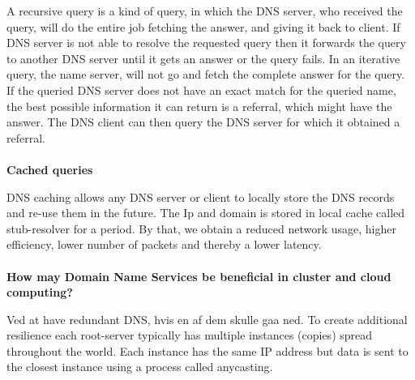 A recursive query is a kind of query, in which the DNS server, who received the query, will do the entire job fetching the answer, and giving it back to client. If DNS server is not able to resolve the requested query then it forwards the query to another DNS server until it gets an answer or the query fails.
In an iterative query, the name server, will not go and fetch the complete answer for the query. If the queried DNS server does not have an exact match for the queried name, the best possible information it can return is a referral, which might have the answer. The DNS client can then query the DNS server for which it obtained a referral.
\\\\
\textbf{Cached queries}

DNS caching allows any DNS server or client to locally store the DNS records and re-use them in the future. The Ip and domain is stored in local cache called stub-resolver for a period. By that, we obtain a reduced network usage, higher efficiency, lower number of packets and thereby a lower latency. 
\\\\
\textbf{How may Domain Name Services be beneficial in cluster and cloud computing?}

Ved at have redundant DNS, hvis en af dem skulle gaa ned.
To create additional resilience each root-server typically has multiple instances (copies) spread throughout the world. Each instance has the same IP address but data is sent to the closest instance using a process called anycasting.
